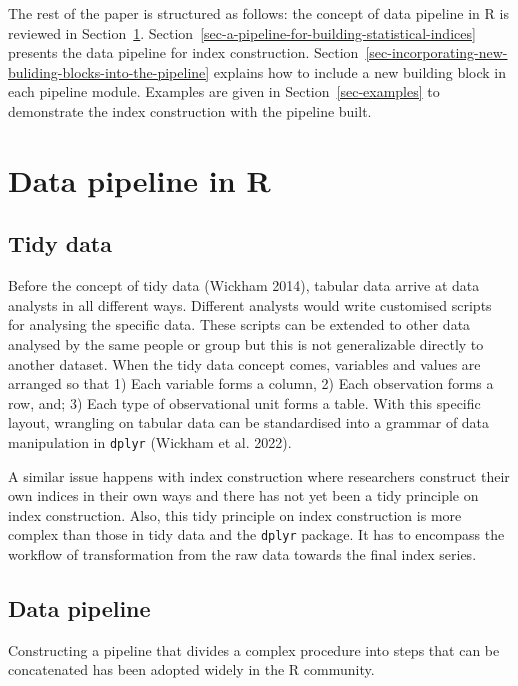 \documentclass[
]{article}
\begin{document}
The rest of the paper is structured as follows: the concept of data
pipeline in R is reviewed in Section~\ref{sec-data-pipeline-in-r}.
Section~\ref{sec-a-pipeline-for-building-statistical-indices} presents
the data pipeline for index construction.
Section~\ref{sec-incorporating-new-buliding-blocks-into-the-pipeline}
explains how to include a new building block in each pipeline module.
Examples are given in Section~\ref{sec-examples} to demonstrate the
index construction with the pipeline built.

\hypertarget{sec-data-pipeline-in-r}{%
\section{Data pipeline in R}\label{sec-data-pipeline-in-r}}

\hypertarget{sec-tidy-data}{%
\subsection{Tidy data}\label{sec-tidy-data}}

Before the concept of tidy data (Wickham 2014), tabular data arrive at
data analysts in all different ways. Different analysts would write
customised scripts for analysing the specific data. These scripts can be
extended to other data analysed by the same people or group but this is
not generalizable directly to another dataset. When the tidy data
concept comes, variables and values are arranged so that 1) Each
variable forms a column, 2) Each observation forms a row, and; 3) Each
type of observational unit forms a table. With this specific layout,
wrangling on tabular data can be standardised into a grammar of data
manipulation in \texttt{dplyr} (Wickham et al. 2022).

A similar issue happens with index construction where researchers
construct their own indices in their own ways and there has not yet been
a tidy principle on index construction. Also, this tidy principle on
index construction is more complex than those in tidy data and the
\texttt{dplyr} package. It has to encompass the workflow of
transformation from the raw data towards the final index series.

\hypertarget{sec-data-pipeline}{%
\subsection{Data pipeline}\label{sec-data-pipeline}}

Constructing a pipeline that divides a complex procedure into steps that
can be concatenated has been adopted widely in the R community.
\end{document}
